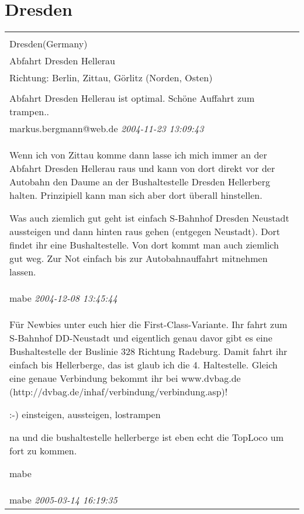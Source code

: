 \documentclass[a4paper,12pt]{article}
\begin{document}
\section{Dresden}
\begin{tabular}{|p{13cm}|}
\hline\\
Dresden(Germany)\\
Abfahrt Dresden Hellerau\\
Richtung: Berlin, Zittau, Görlitz (Norden, Osten) \\
\hline\\
Abfahrt Dresden Hellerau ist optimal. Schöne Auffahrt zum trampen.. \\
markus.bergmann@web.de \textit{ 2004-11-23 13:09:43 }\\\hline Wenn ich von Zittau komme dann lasse ich mich immer an der Abfahrt Dresden Hellerau raus und kann von dort direkt vor der Autobahn den Daume an der Bushaltestelle Dresden Hellerberg halten. Prinzipiell kann man sich aber dort überall hinstellen.

Was auch ziemlich gut geht ist einfach S-Bahnhof Dresden Neustadt aussteigen und dann hinten raus gehen (entgegen Neustadt). Dort findet ihr eine Bushaltestelle. Von dort kommt man auch ziemlich gut weg. Zur Not einfach bis zur Autobahnauffahrt mitnehmen lassen. \\
mabe \textit{ 2004-12-08 13:45:44 }\\\hline Für Newbies unter euch hier die First-Class-Variante. Ihr fahrt zum S-Bahnhof DD-Neustadt und eigentlich genau davor gibt es eine Bushaltestelle der Buslinie 328 Richtung Radeburg. Damit fahrt ihr einfach bis Hellerberge, das ist glaub ich die 4. Haltestelle. Gleich eine genaue Verbindung bekommt ihr bei www.dvbag.de (http://dvbag.de/inhaf/verbindung/verbindung.asp)!

:-) einsteigen, aussteigen, lostrampen

na und die bushaltestelle hellerberge ist eben echt die TopLoco um fort zu kommen.

mabe \\
mabe \textit{ 2005-03-14 16:19:35 }\\\hline
\end{tabular}
\end{document}
